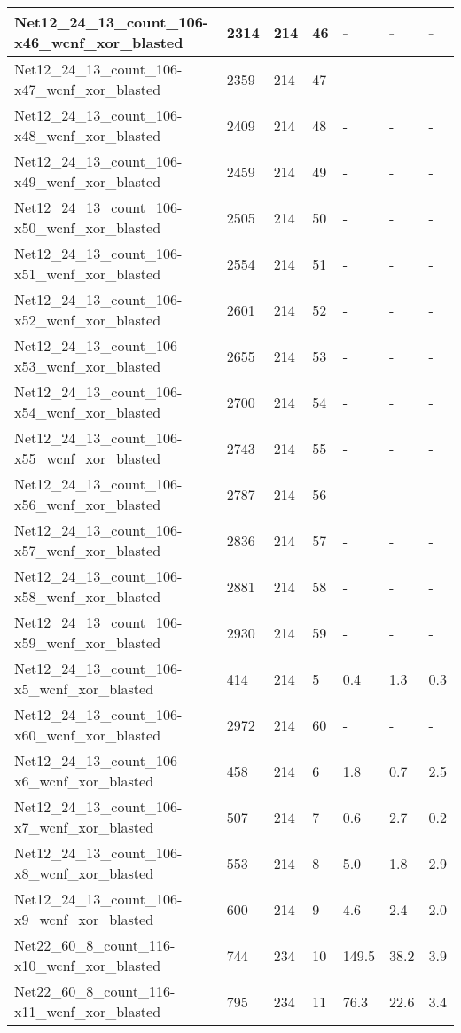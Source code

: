 \begin{scriptsize}
\begin{longtable}{|p{5cm}|l|l|l|l|l|l|}
Net12\_24\_13\_count\_106-x46\_wcnf\_xor\_blasted&2314&214&46&-&-&- \\ \hline 
Net12\_24\_13\_count\_106-x47\_wcnf\_xor\_blasted&2359&214&47&-&-&- \\ \hline 
Net12\_24\_13\_count\_106-x48\_wcnf\_xor\_blasted&2409&214&48&-&-&- \\ \hline 
Net12\_24\_13\_count\_106-x49\_wcnf\_xor\_blasted&2459&214&49&-&-&- \\ \hline 
Net12\_24\_13\_count\_106-x50\_wcnf\_xor\_blasted&2505&214&50&-&-&- \\ \hline 
Net12\_24\_13\_count\_106-x51\_wcnf\_xor\_blasted&2554&214&51&-&-&- \\ \hline 
Net12\_24\_13\_count\_106-x52\_wcnf\_xor\_blasted&2601&214&52&-&-&- \\ \hline 
Net12\_24\_13\_count\_106-x53\_wcnf\_xor\_blasted&2655&214&53&-&-&- \\ \hline 
Net12\_24\_13\_count\_106-x54\_wcnf\_xor\_blasted&2700&214&54&-&-&- \\ \hline 
Net12\_24\_13\_count\_106-x55\_wcnf\_xor\_blasted&2743&214&55&-&-&- \\ \hline 
Net12\_24\_13\_count\_106-x56\_wcnf\_xor\_blasted&2787&214&56&-&-&- \\ \hline 
Net12\_24\_13\_count\_106-x57\_wcnf\_xor\_blasted&2836&214&57&-&-&- \\ \hline 
Net12\_24\_13\_count\_106-x58\_wcnf\_xor\_blasted&2881&214&58&-&-&- \\ \hline 
Net12\_24\_13\_count\_106-x59\_wcnf\_xor\_blasted&2930&214&59&-&-&- \\ \hline 
Net12\_24\_13\_count\_106-x5\_wcnf\_xor\_blasted&414&214&5&0.4&1.3&0.3 \\ \hline 
Net12\_24\_13\_count\_106-x60\_wcnf\_xor\_blasted&2972&214&60&-&-&- \\ \hline 
Net12\_24\_13\_count\_106-x6\_wcnf\_xor\_blasted&458&214&6&1.8&0.7&2.5 \\ \hline 
Net12\_24\_13\_count\_106-x7\_wcnf\_xor\_blasted&507&214&7&0.6&2.7&0.2 \\ \hline 
Net12\_24\_13\_count\_106-x8\_wcnf\_xor\_blasted&553&214&8&5.0&1.8&2.9 \\ \hline 
Net12\_24\_13\_count\_106-x9\_wcnf\_xor\_blasted&600&214&9&4.6&2.4&2.0 \\ \hline 
Net22\_60\_8\_count\_116-x10\_wcnf\_xor\_blasted&744&234&10&149.5&38.2&3.9 \\ \hline 
Net22\_60\_8\_count\_116-x11\_wcnf\_xor\_blasted&795&234&11&76.3&22.6&3.4 \\ \hline 

\end{longtable}
\end{scriptsize}
